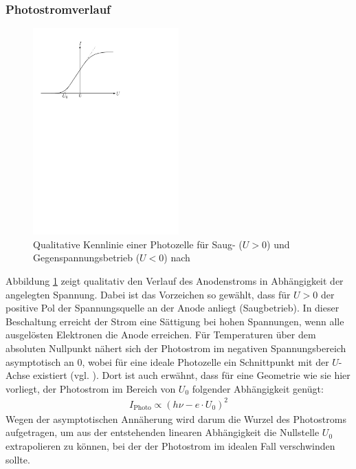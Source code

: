 \documentclass[11pt, a4paper]{article}
\numberwithin{equation}{section}
\begin{document}
\subsubsection{Photostromverlauf}
\begin{figure}[h]
\centering
\includegraphics[width=0.5\textwidth]{./figures/kennlinie_photozelle.pdf}
\caption{Qualitative Kennlinie einer Photozelle für Saug- ($U>0$) und Gegenspannungsbetrieb ($U<0$) nach \cite{prak_uheidelberg}}
\label{fig:kennlinie}
\end{figure}
Abbildung \ref{fig:kennlinie} zeigt qualitativ den Verlauf des Anodenstroms in Abhängigkeit der angelegten Spannung. Dabei ist das Vorzeichen so gewählt, dass für $U>0$ der positive Pol der Spannungsquelle an der Anode anliegt (Saugbetrieb).
In dieser Beschaltung erreicht der Strom eine Sättigung bei hohen Spannungen, wenn alle ausgelösten Elektronen die Anode erreichen.
Für Temperaturen über dem absoluten Nullpunkt nähert sich der Photostrom im negativen Spannungsbereich asymptotisch an $0$, wobei für eine ideale Photozelle ein Schnittpunkt mit der $U$-Achse existiert (vgl. \cite{prak_uheidelberg}).
Dort ist auch erwähnt, dass für eine Geometrie wie sie hier vorliegt, der Photostrom im Bereich von $U_0$ folgender Abhängigkeit genügt:
\begin{align*}
	I_\mathrm{Photo} \propto (h \nu - e \cdot U_0)^2
\end{align*}
Wegen der asymptotischen Annäherung wird darum die Wurzel des Photostroms aufgetragen, um aus der entstehenden linearen Abhängigkeit die Nullstelle $U_0$ extrapolieren zu können, bei der der Photostrom im idealen Fall verschwinden sollte.
\end{document}
